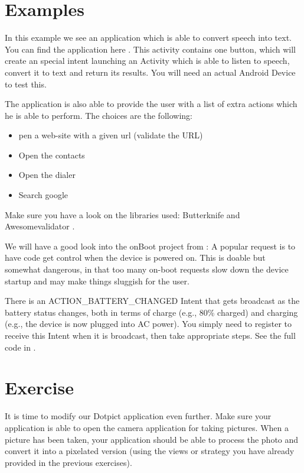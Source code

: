 \section{Examples}

\begin{example}
	In this example we see an application which is able to convert speech into text. You can find the application here \cite{Buysse18}. This activity contains one button, which will create an special intent launching an Activity which is able to listen to speech, convert it to text and return its results. You will need an actual Android Device to test this. 
	
	The application is also  able to provide the user with a list of extra actions which he is able to perform. The choices are the following:
	\begin{itemize}
		\item pen a web-site with a given url (validate the URL)
		\item Open the contacts
		\item Open the dialer
		\item Search google
	\end{itemize}
Make sure you have a look on the libraries used: Butterknife and Awesomevalidator \cite{Li2016}.
\end{example}


\begin{example}
We will have a good look into the onBoot project from \cite{murphymarkl.2017}: A popular request is to have code get control when the device is powered on. This is
doable but somewhat dangerous, in that too many on-boot requests slow down the
device startup and may make things sluggish for the user.
\end{example}

\begin{example}
	There is an ACTION\_BATTERY\_CHANGED Intent that gets broadcast as the battery
	status changes, both in terms of charge (e.g., 80\% charged) and charging (e.g., the
	device is now plugged into AC power). You simply need to register to receive this
	Intent when it is broadcast, then take appropriate steps. See the full code in \cite{murphymarkl.2017}.
\end{example}

\pagebreak

\section{Exercise}
\begin{exercise}
	It is time to modify our Dotpict application even further. Make sure your application is able to open the camera application for taking pictures. When a picture has been taken, your application should be able to process the photo and convert it into a pixelated version (using the views or strategy you have already provided in the previous exercises).
\end{exercise}


